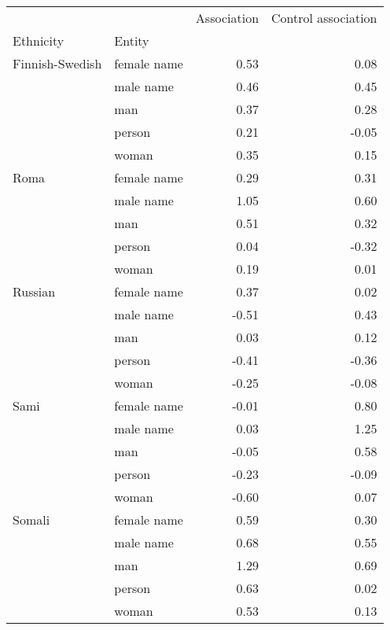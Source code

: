 \begin{tabular}{llrr}
\toprule
       &       &  Association &  Control association \\
Ethnicity & Entity &              &                      \\
\midrule
Finnish-Swedish & female name &         0.53 &                 0.08 \\
       & male name &         0.46 &                 0.45 \\
       & man &         0.37 &                 0.28 \\
       & person &         0.21 &                -0.05 \\
       & woman &         0.35 &                 0.15 \\
Roma & female name &         0.29 &                 0.31 \\
       & male name &         1.05 &                 0.60 \\
       & man &         0.51 &                 0.32 \\
       & person &         0.04 &                -0.32 \\
       & woman &         0.19 &                 0.01 \\
Russian & female name &         0.37 &                 0.02 \\
       & male name &        -0.51 &                 0.43 \\
       & man &         0.03 &                 0.12 \\
       & person &        -0.41 &                -0.36 \\
       & woman &        -0.25 &                -0.08 \\
Sami & female name &        -0.01 &                 0.80 \\
       & male name &         0.03 &                 1.25 \\
       & man &        -0.05 &                 0.58 \\
       & person &        -0.23 &                -0.09 \\
       & woman &        -0.60 &                 0.07 \\
Somali & female name &         0.59 &                 0.30 \\
       & male name &         0.68 &                 0.55 \\
       & man &         1.29 &                 0.69 \\
       & person &         0.63 &                 0.02 \\
       & woman &         0.53 &                 0.13 \\
\bottomrule
\end{tabular}

